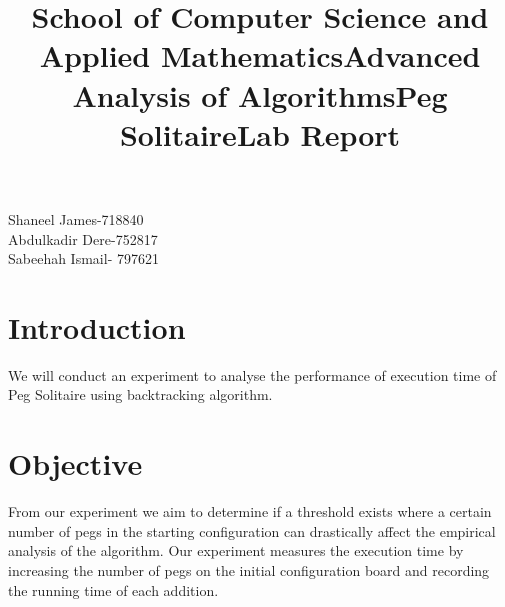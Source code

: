 \documentclass[12pt]{article}
\begin{document}
\title{\textbf{School of Computer Science and Applied Mathematics}}
\maketitle
\title{\textbf{Advanced Analysis of Algorithms}}
\maketitle

\begin{center}
\title{\textbf{Peg Solitaire}}

\maketitle
\end{center}
\begin{center}
\title{Lab Report}
\maketitle

\end{center}

\begin{center}

Shaneel James-718840
\\Abdulkadir Dere-752817
\\Sabeehah Ismail- 797621
\end{center}



\newpage

\tableofcontents
\newpage
\section{Introduction}
We will conduct an experiment to analyse the performance of execution time of Peg Solitaire using backtracking algorithm. 


\section{Objective}
From our experiment we aim to determine if a threshold exists where a certain number of pegs in the starting configuration can drastically affect the empirical analysis of the algorithm. Our experiment measures the execution time by increasing the number of pegs on the initial configuration board and recording the running time of each addition.
\end{document}
